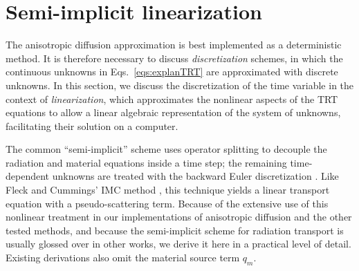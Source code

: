 \section{Semi-implicit linearization}\label{sec:bgSemiImplicit}

The anisotropic diffusion approximation is best implemented as a deterministic
method. It is
therefore necessary to discuss \emph{discretization} schemes,
in which the continuous unknowns in Eqs.~\eqref{eqs:explanTRT} are approximated
with discrete unknowns. In this section, we discuss the discretization of the
time variable in the context of \emph{linearization}, which approximates
the nonlinear aspects of the TRT equations to allow a linear algebraic
representation of the system of unknowns, facilitating their solution on a
computer.

The common
``semi-implicit'' scheme uses operator splitting
to decouple the radiation and material equations inside a time step; the
remaining time-dependent unknowns are treated with the backward Euler
discretization \cite{Kno1999a,Kno2001,Low2004}.
Like Fleck and Cummings' IMC method \cite{Fle1971}, this technique
yields a linear transport equation with a pseudo-scattering term. Because of the
extensive use of this
nonlinear treatment in our implementations of anisotropic diffusion and the
other tested methods, and because the semi-implicit scheme for radiation
transport is usually glossed over in other works, we derive
it here in a practical level of detail. Existing derivations also omit the
material source term $q_m$.

